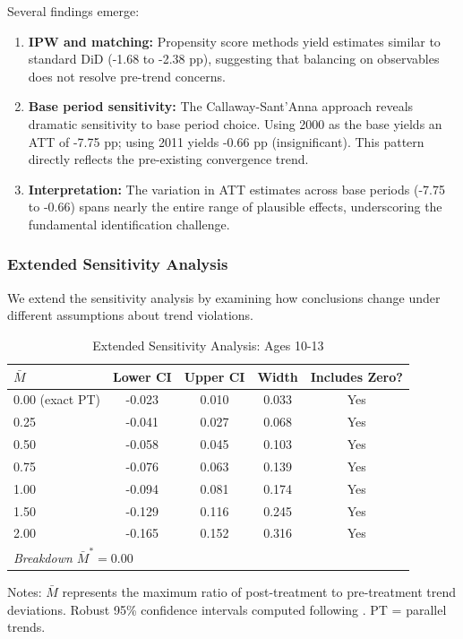 Several findings emerge:
\begin{enumerate}
\item \textbf{IPW and matching:} Propensity score methods yield estimates similar to standard DiD (-1.68 to -2.38 pp), suggesting that balancing on observables does not resolve pre-trend concerns.

\item \textbf{Base period sensitivity:} The Callaway-Sant'Anna approach reveals dramatic sensitivity to base period choice. Using 2000 as the base yields an ATT of -7.75 pp; using 2011 yields -0.66 pp (insignificant). This pattern directly reflects the pre-existing convergence trend.

\item \textbf{Interpretation:} The variation in ATT estimates across base periods (-7.75 to -0.66) spans nearly the entire range of plausible effects, underscoring the fundamental identification challenge.
\end{enumerate}

\subsubsection{Extended Sensitivity Analysis}

We extend the \citet{RambachanRoth2023} sensitivity analysis by examining how conclusions change under different assumptions about trend violations.

\begin{table}[H]
\centering
\caption{Extended Sensitivity Analysis: Ages 10-13}
\label{tab:sensitivity_extended}
\begin{threeparttable}
\begin{tabular}{lcccc}
\toprule
$\bar{M}$ & Lower CI & Upper CI & Width & Includes Zero? \\
\midrule
0.00 (exact PT) & -0.023 & 0.010 & 0.033 & Yes \\
0.25 & -0.041 & 0.027 & 0.068 & Yes \\
0.50 & -0.058 & 0.045 & 0.103 & Yes \\
0.75 & -0.076 & 0.063 & 0.139 & Yes \\
1.00 & -0.094 & 0.081 & 0.174 & Yes \\
1.50 & -0.129 & 0.116 & 0.245 & Yes \\
2.00 & -0.165 & 0.152 & 0.316 & Yes \\
\midrule
\multicolumn{5}{l}{\textit{Breakdown $\bar{M}^* = 0.00$}} \\
\bottomrule
\end{tabular}
\begin{tablenotes}
\footnotesize
\item Notes: $\bar{M}$ represents the maximum ratio of post-treatment to pre-treatment trend deviations. Robust 95\% confidence intervals computed following \citet{RambachanRoth2023}. PT = parallel trends.
\end{tablenotes}
\end{threeparttable}
\end{table}

